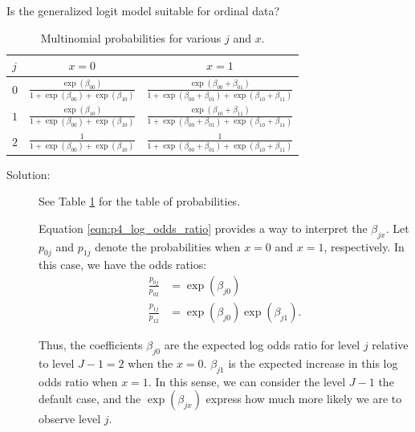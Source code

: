 \documentclass[letterpaper,11pt]{article}
\begin{document}
\begin{enumerate}
  Is the generalized logit model suitable for ordinal data?

  \begin{table}[h]
    \small
    \centering
    \begin{tabular}{lcc}    
      \toprule
      $j$ & $x = 0$ & $x = 1$ \\
      \midrule
      $0$ & $\displaystyle\frac{\exp\left(\beta_{00}\right)}{1 + \exp\left(\beta_{00}\right) + \exp\left(\beta_{10}\right)}$ & $\displaystyle\frac{\exp\left(\beta_{00} + \beta_{01}\right)}{1 + \exp\left(\beta_{00} + \beta_{01}\right) + \exp\left(\beta_{10} + \beta_{11}\right)}$ \\
      $1$ & $\displaystyle\frac{\exp\left(\beta_{10}\right)}{1 + \exp\left(\beta_{00}\right) + \exp\left(\beta_{10}\right)}$ & $\displaystyle\frac{\exp\left(\beta_{10} + \beta_{11}\right)}{1 + \exp\left(\beta_{00} + \beta_{01}\right) + \exp\left(\beta_{10} + \beta_{11}\right)}$ \\
      $2$ & $\displaystyle\frac{1}{1 + \exp\left(\beta_{00}\right) + \exp\left(\beta_{10}\right)}$ & $\displaystyle\frac{1}{1 + \exp\left(\beta_{00} + \beta_{01}\right) + \exp\left(\beta_{10} + \beta_{11}\right)}$ \\
      \bottomrule
    \end{tabular}
    \caption{Multinomial probabilities for various $j$ and $x$.}
    \label{tab:p4_multinomial_probability}
  \end{table}

  \begin{description}
  \item[Solution:] See Table \ref{tab:p4_multinomial_probability} for the table
    of probabilities.

    Equation \ref{eqn:p4_log_odds_ratio} provides a way to interpret the
    $\beta_{jx}$. Let $p_{0j}$ and $p_{1j}$ denote the probabilities when
    $x = 0$ and $x = 1$, respectively. In this case, we have the odds ratios:
    \begin{align*}
      \frac{p_{0j}}{p_{02}} &= \exp\left(\beta_{j0}\right) \\
      \frac{p_{1j}}{p_{12}} &= \exp\left(\beta_{j0}\right)\exp\left(\beta_{j1}\right).
    \end{align*}

    Thus, the coefficients $\beta_{j0}$ are the expected log odds ratio for
    level $j$ relative to level $J - 1 = 2$ when the $x = 0$. $\beta_{j1}$ is
    the expected increase in this log odds ratio when $x = 1$. In this sense, we
    can consider the level $J - 1$ the default case, and the
    $\exp\left(\beta_{jx}\right)$ express how much more likely we are to
    observe level $j$.


\end{description}
\end{enumerate}
\end{document}
